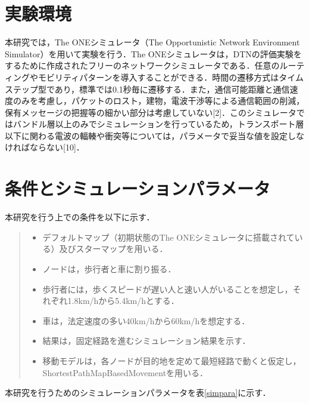 \documentclass[11pt]{icsthesis}
\begin{document}
\section{実験環境}
本研究では，The ONEシミュレータ（The Opportunistic Network Environment Simulator）を用いて実験を行う．The ONEシミュレータは，DTNの評価実験をするために作成されたフリーのネットワークシミュレータである．任意のルーティングやモビリティパターンを導入することができる．時間の遷移方式はタイムステップ型であり，標準では0.1秒毎に遷移する．また，通信可能距離と通信速度のみを考慮し，パケットのロスト，建物，電波干渉等による通信範囲の削減，保有メッセージの把握等の細かい部分は考慮していない[2]．このシミュレータではバンドル層以上のみでシミュレーションを行っているため，トランスポート層以下に関わる電波の輻輳や衝突等については，パラメータで妥当な値を設定しなければならない[10]．

\section{条件とシミュレーションパラメータ}
本研究を行う上での条件を以下に示す．
\begin{quote}
 \begin{itemize}
  \item デフォルトマップ（初期状態のThe ONEシミュレータに搭載されている）及びスターマップを用いる．
  \item ノードは，歩行者と車に割り振る．
  \item 歩行者には，歩くスピードが遅い人と速い人がいることを想定し，それぞれ1.8km/hから5.4km/hとする．
  \item 車は，法定速度の多い40km/hから60km/hを想定する．
  \item 結果は，固定経路を進むシミュレーション結果を示す．
  \item 移動モデルは，各ノードが目的地を定めて最短経路で動くと仮定し，ShortestPathMapBasedMovementを用いる．
 \end{itemize}
\end{quote}
本研究を行うためのシミュレーションパラメータを表\ref{simpara}に示す．
\end{document}
